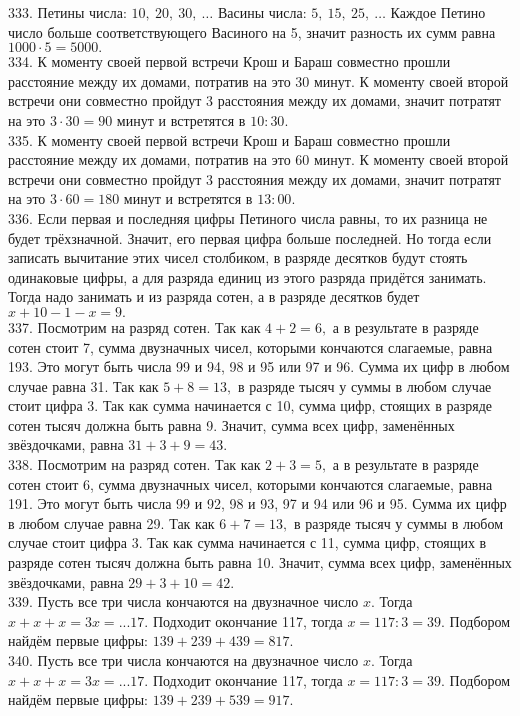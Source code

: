 333. Петины числа: $10,\ 20,\ 30,\ \ldots$ Васины числа: $5,\ 15,\ 25,\ \ldots$ Каждое Петино число больше соответствующего Васиного на 5, значит разность их сумм равна $1000\cdot5=5000.$\\
334. К моменту своей первой встречи Крош и Бараш совместно прошли расстояние между их домами, потратив на это 30 минут. К моменту своей второй встречи они совместно пройдут 3 расстояния между их домами, значит потратят на это $3\cdot30=90$ минут и встретятся в $10:30.$\\
335. К моменту своей первой встречи Крош и Бараш совместно прошли расстояние между их домами, потратив на это 60 минут. К моменту своей второй встречи они совместно пройдут 3 расстояния между их домами, значит потратят на это $3\cdot60=180$ минут и встретятся в $13:00.$\\
336. Если первая и последняя цифры Петиного числа равны, то их разница не будет трёхзначной. Значит, его первая цифра больше последней. Но тогда если записать вычитание этих чисел столбиком, в разряде десятков будут стоять одинаковые цифры, а для разряда единиц из этого разряда придётся занимать. Тогда надо занимать и из разряда сотен, а в разряде десятков будет $x+10-1-x=9.$\\
337. Посмотрим на разряд сотен. Так как $4+2=6,$ а в результате в разряде сотен стоит 7, сумма двузначных чисел, которыми кончаются слагаемые, равна 193. Это могут быть числа 99 и 94, 98 и 95 или 97 и 96. Сумма их цифр в любом случае равна 31. Так как $5+8=13,$ в разряде тысяч у суммы в любом случае стоит цифра 3. Так как сумма начинается с 10, сумма цифр, стоящих в разряде сотен тысяч должна быть равна 9. Значит, сумма всех цифр, заменённых звёздочками, равна $31+3+9=43.$\\
338. Посмотрим на разряд сотен. Так как $2+3=5,$ а в результате в разряде сотен стоит 6, сумма двузначных чисел, которыми кончаются слагаемые, равна 191. Это могут быть числа 99 и 92, 98 и 93, 97 и 94 или 96 и 95. Сумма их цифр в любом случае равна 29. Так как $6+7=13,$ в разряде тысяч у суммы в любом случае стоит цифра 3. Так как сумма начинается с 11, сумма цифр, стоящих в разряде сотен тысяч должна быть равна 10. Значит, сумма всех цифр, заменённых звёздочками, равна $29+3+10=42.$\\
339. Пусть все три числа кончаются на двузначное число $x.$ Тогда $x+x+x=3x=...17.$ Подходит окончание 117, тогда $x=117:3=39.$ Подбором найдём первые цифры: $139+239+439=817.$\\
340. Пусть все три числа кончаются на двузначное число $x.$ Тогда $x+x+x=3x=...17.$ Подходит окончание 117, тогда $x=117:3=39.$ Подбором найдём первые цифры: $139+239+539=917.$\\
